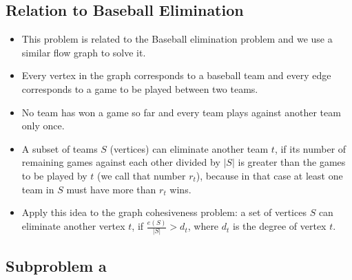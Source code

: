 \documentclass[12pt]{article}
\begin{document}
\subsection*{Relation to Baseball Elimination}
\begin{itemize}
	\item This problem is related to the Baseball elimination problem and we use a similar flow graph to solve it.
	\item Every vertex in the graph corresponds to a baseball team and every edge corresponds to a game to be played between two teams.
	\item No team has won a game so far and every team plays against another team only once.
	\item A subset of teams $S$ (vertices) can eliminate another team $t$, if its number of remaining games against each other divided by $|S|$ is greater than the games to be played by $t$ (we call that number $r_t$), because in that case at least one team in $S$ must have more than $r_t$ wins.
	\item Apply this idea to the graph cohesiveness problem: a set of vertices $S$ can eliminate another vertex $t$, if $\frac{e(S)}{|S|} > d_t$, where $d_t$ is the degree of vertex $t$.
\end{itemize}

\subsection*{Subproblem a}
\end{document}
